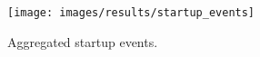 
\begin{figure}[H]
	\centering
    \texttt{[image: images/results/startup\_events]}
    \caption{Aggregated startup events.}
    \label{fig:aggregated_startup_events}
\end{figure}
